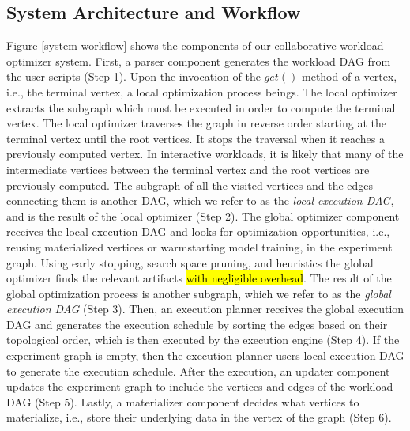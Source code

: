 \subsection{System Architecture and Workflow}
Figure \ref{system-workflow} shows the components of our collaborative workload optimizer system.
First, a parser component generates the workload DAG from the user scripts (Step 1).
Upon the invocation of the $get()$ method of a vertex, i.e., the terminal vertex, a local optimization process beings.
The local optimizer extracts the subgraph which must be executed in order to compute the terminal vertex.
The local optimizer traverses the graph in reverse order starting at the terminal vertex until the root vertices.
It stops the traversal when it reaches a previously computed vertex.
In interactive workloads, it is likely that many of the intermediate vertices between the terminal vertex and the root vertices are previously computed.
The subgraph of all the visited vertices and the edges connecting them is another DAG, which we refer to as the \textit{local execution DAG}, and is the result of the local optimizer (Step 2).
The global optimizer component receives the local execution DAG and looks for optimization opportunities, i.e., reusing materialized vertices or warmstarting model training, in the experiment graph.
Using early stopping, search space pruning, and heuristics the global optimizer finds the relevant artifacts \hl{with negligible overhead}.
The result of the global optimization process is another subgraph, which we refer to as the \textit{global execution DAG} (Step 3).
Then, an execution planner receives the global execution DAG and generates the execution schedule by sorting the edges based on their topological order, which is then executed by the execution engine (Step 4).
If the experiment graph is empty, then the execution planner users local execution DAG to generate the execution schedule.
After the execution, an updater component updates the experiment graph to include the vertices and edges of the workload DAG (Step 5).
Lastly, a materializer component decides what vertices to materialize, i.e., store their underlying data in the vertex of the graph (Step 6).


